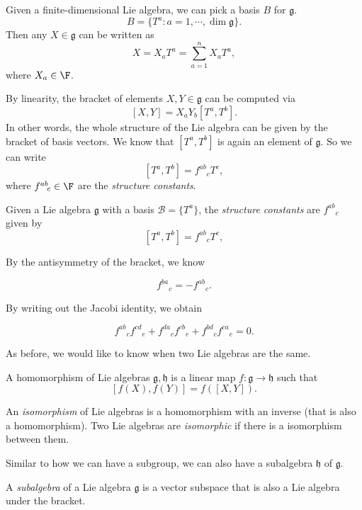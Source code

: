 \documentclass[a4paper]{article}
\begin{document}
Given a finite-dimensional Lie algebra, we can pick a basis $B$ for $\mathfrak{g}$.
\[
  B = \{T^a: a = 1, \cdots, \dim \mathfrak{g}\}.
\]
Then any $X \in \mathfrak{g}$ can be written as
\[
  X = X_a T^a = \sum_{a = 1}^n X_a T^a,
\]
where $X_a \in \F$.

By linearity, the bracket of elements $X, Y \in \mathfrak{g}$ can be computed via
\[
  [X, Y] = X_a Y_b [T^a, T^b].
\]
In other words, the whole structure of the Lie algebra can be given by the bracket of basis vectors. We know that $[T^a, T^b]$ is again an element of $\mathfrak{g}$. So we can write
\[
  [T^a, T^b] = f^{ab}\!_c T^c,
\]
where $f^{ab}\!_c\in \F$ are the \emph{structure constants}.
\begin{defi}
  Given a Lie algebra $\mathfrak{g}$ with a basis $\mathcal{B} = \{T^a\}$, the \emph{structure constants} are $f^{ab}\!_c$ given by
  \[
    [T^a, T^b] = f^{ab}\!_c T^c,
  \]
\end{defi}

By the antisymmetry of the bracket, we know
\begin{prop}
  \[
    f^{ba}\!_c = -f^{ab}\!_c.
  \]
\end{prop}

By writing out the Jacobi identity, we obtain
\begin{prop}
  \[
    f^{ab}\!_c f^{cd}\!_e + f^{da}\!_c f^{cb}\!_e + f^{bd}\!_c f^{ca}\!_e = 0.
  \]
\end{prop}

As before, we would like to know when two Lie algebras are the same.
\begin{defi}
  A homomorphism of Lie algebras $\mathfrak{g}, \mathfrak{h}$ is a linear map $f: \mathfrak{g} \to \mathfrak{h}$ such that
  \[
    [f(X), f(Y)] = f([X, Y]).
  \]
\end{defi}

\begin{defi}
  An \emph{isomorphism} of Lie algebras is a homomorphism with an inverse (that is also a homomorphism). Two Lie algebras are \emph{isomorphic} if there is a isomorphism between them.
\end{defi}

Similar to how we can have a subgroup, we can also have a subalgebra $\mathfrak{h}$ of $\mathfrak{g}$.

\begin{defi}[Subalgebra]
  A \emph{subalgebra} of a Lie algebra $\mathfrak{g}$ is a vector subspace that is also a Lie algebra under the bracket.
\end{defi}
\end{document}
